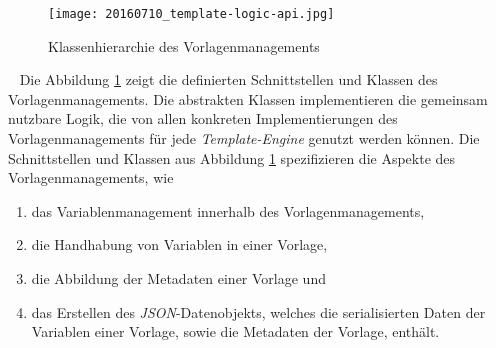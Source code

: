 \begin{figure}[h]
\centering
\texttt{[image: 20160710\_template-logic-api.jpg]} %
\caption{Klassenhierarchie des Vorlagenmanagements}
\label{fig:template-logic-api-hierarchy}
\end{figure}
\ \newline
Die Abbildung \ref{fig:template-logic-api-hierarchy} zeigt die definierten Schnittstellen und Klassen des Vorlagenmanagements. Die abstrakten Klassen implementieren die gemeinsam nutzbare Logik, die von allen konkreten Implementierungen des Vorlagenmanagements für jede \emph{Template-Engine} genutzt werden können. Die Schnittstellen und Klassen aus Abbildung \ref{fig:template-logic-api-hierarchy} spezifizieren die Aspekte des Vorlagenmanagements, wie
\begin{enumerate}
	\item das Variablenmanagement innerhalb des Vorlagenmanagements,
	\item die Handhabung von Variablen in einer Vorlage,
	\item die Abbildung der Metadaten einer Vorlage und 
	\item das Erstellen des \emph{JSON}-Datenobjekts, welches die serialisierten Daten der Variablen einer Vorlage, sowie die Metadaten der Vorlage, enthält.
\end{enumerate}

